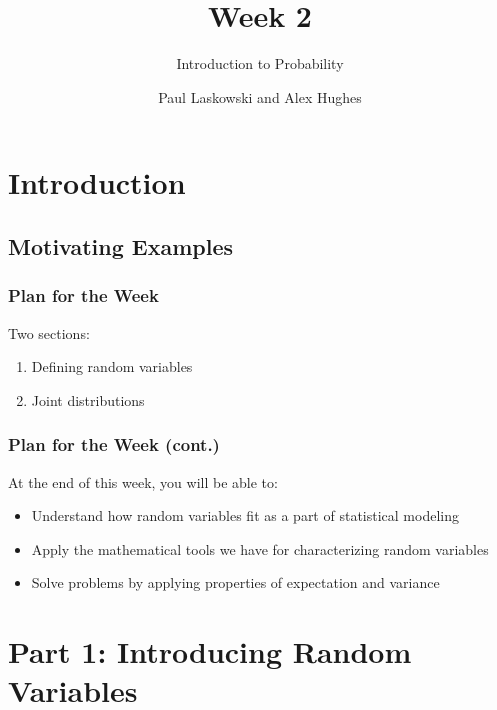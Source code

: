 \documentclass[12pt, block=fill]{beamer}
\title{Week 2}
\subtitle{Introduction to Probability}
\author{Paul Laskowski and Alex Hughes}
\institute{UC Berkeley, School of Information}
\begin{document}
\begin{frame}
\maketitle
\end{frame} 

\begin{frame} 
\footnotesize
\tableofcontents[hideallsubsections]
\end{frame}

\section{Introduction}
\subsection{Motivating Examples}

\begin{frame}
  \frametitle{Plan for the Week}
  Two sections:
  \begin{enumerate}
  \item Defining random variables
  \item Joint distributions
  \end{enumerate}

    
      
\end{frame}

\begin{frame}
  \frametitle{Plan for the Week (cont.)}
  At the end of this week, you will be able to:
  \begin{itemize}
  \item Understand how random variables fit as a part of statistical
    modeling
  \item Apply the mathematical tools we have for characterizing random
    variables
  \item Solve problems by applying properties of expectation and
    variance
  \end{itemize}
  \note[item]{}
\end{frame}

\section{Part 1: Introducing Random Variables}
\end{document}
